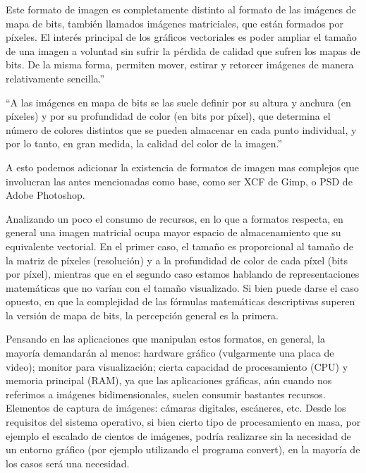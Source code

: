 \documentclass[12pt]{article}
\begin{document}
Este formato de imagen es completamente distinto al formato de las imágenes de mapa de bits, también 
llamados imágenes matriciales, que están formados por píxeles. El interés principal de los gráficos 
vectoriales es poder ampliar el tamaño de una imagen a voluntad sin sufrir la pérdida 
de calidad que sufren los mapas de bits. De la misma forma, permiten mover, estirar y 
retorcer imágenes de manera relativamente sencilla.'' \cite{wikiives}

``A las imágenes en mapa de bits se las suele definir por su altura y anchura (en píxeles) y por 
su profundidad de color (en bits por píxel), que determina el número de colores distintos que se 
pueden almacenar en cada punto individual, y por lo tanto, en gran medida, la calidad del color de la imagen.''
\cite{wikiimes}

A esto podemos adicionar la existencia de formatos de imagen mas complejos que involucran las antes mencionadas
como base, como ser XCF de Gimp, o PSD de Adobe Photoshop. 

Analizando un poco el consumo de recursos, en lo que a formatos respecta, en general una 
imagen matricial ocupa mayor espacio de almacenamiento que su equivalente vectorial. En el 
primer caso, el tamaño es proporcional al tamaño de la matriz de píxeles (resolución) y a la
profundidad de color de cada píxel (bits por píxel), mientras que en el segundo caso estamos 
hablando de representaciones matemáticas que no varían con el tamaño visualizado. Si bien puede 
darse el caso opuesto, en que la complejidad de las fórmulas matemáticas descriptivas superen 
la versión de mapa de bits, la percepción general es la primera. 

Pensando en las aplicaciones que manipulan estos formatos, en general, la mayoría demandarán al 
menos: hardware gráfico (vulgarmente una placa de video); 
monitor para visualización; cierta capacidad de procesamiento (CPU) y memoria principal (RAM), ya que 
las aplicaciones gráficas, aún cuando nos referimos a imágenes bidimensionales, suelen consumir bastantes 
recursos. Elementos de captura de imágenes: cámaras digitales, escáneres, etc.  
Desde los requisitos del sistema operativo, si bien cierto tipo de procesamiento en masa,
por ejemplo el escalado de cientos de imágenes, podría realizarse sin la necesidad de un
entorno gráfico (por ejemplo utilizando el programa convert), en la mayoría de los casos será una 
necesidad.  
\end{document}

